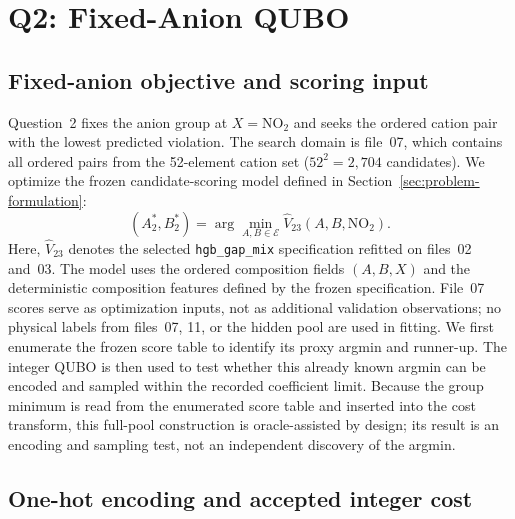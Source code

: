 \section{Q2: Fixed-Anion QUBO}
\label{sec:q2-qubo}

\subsection{Fixed-anion objective and scoring input}

Question~2 fixes the anion group at $X=\mathrm{NO}_2$ and seeks the
ordered cation pair with the lowest predicted violation.  The search domain
is file~07, which contains all ordered pairs from the 52-element cation set
($52^2=2,704$ candidates).  We optimize the frozen candidate-scoring model
defined in Section~\ref{sec:problem-formulation}:
\begin{equation}
  (A_2^*,B_2^*)=
  \arg\min_{A,B\in\mathcal E}
  \widehat V_{23}(A,B,\mathrm{NO}_2).
  \label{eq:q2-fixed-objective}
\end{equation}
Here, $\widehat V_{23}$ denotes the selected \texttt{hgb\_gap\_mix}
specification refitted on files~02 and~03.  The model uses the ordered
composition fields $(A,B,X)$ and the deterministic composition features
defined by the frozen specification.  File~07 scores serve as optimization
inputs, not as additional validation observations; no physical labels from
files~07, 11, or the hidden pool are used in fitting.  We first enumerate
the frozen score table to identify its proxy argmin and runner-up.  The
integer QUBO is then used to test whether this already known argmin can be
encoded and sampled within the recorded coefficient limit.  Because the
group minimum is read from the enumerated score table and inserted into the
cost transform, this full-pool construction is oracle-assisted by design;
its result is an encoding and sampling test, not an independent discovery
of the argmin.

\subsection{One-hot encoding and accepted integer cost}


